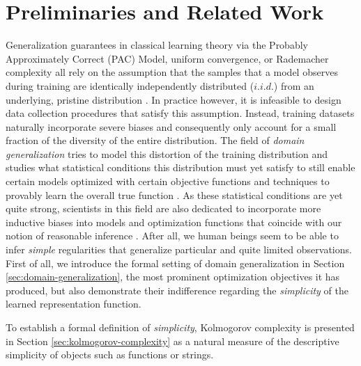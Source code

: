
\chapter{Preliminaries and Related Work}
\label{chap:preliminaries}
Generalization guarantees in classical learning theory via the Probably Approximately Correct (PAC) Model, uniform convergence, or Rademacher complexity all rely on the assumption that the samples that a model observes during training are identically independently distributed ($i.i.d.$) from an underlying, pristine distribution \cite[Chapter 3f]{shalev2014understanding}.
In practice however, it is infeasible to design data collection procedures that satisfy this assumption. Instead, training datasets naturally incorporate severe biases and consequently only account for a small fraction of the diversity of the entire distribution.
The field of \textit{domain generalization} tries to model this distortion of the training distribution and studies what statistical conditions this distribution must yet satisfy to still enable certain models optimized with certain objective functions and techniques to provably learn the overall true function \cite{wang2022generalizing}.
As these statistical conditions are yet quite strong, scientists in this field are also dedicated to incorporate more inductive biases into models and optimization functions that coincide with our notion of reasonable inference \cite{arjovsky2019invariant}\cite{krueger2021out}.
After all, we human beings seem to be able to infer \textit{simple} regularities that generalize particular and quite limited observations.
First of all, we introduce the formal setting of domain generalization in Section \ref{sec:domain-generalization}, the most prominent optimization objectives it has produced, but also demonstrate their indifference regarding the \textit{simplicity} of the learned representation function. 

To establish a formal definition of \textit{simplicity}, Kolmogorov complexity is presented in Section \ref{sec:kolmogorov-complexity} as a natural measure of the descriptive simplicity of objects such as functions or strings.


